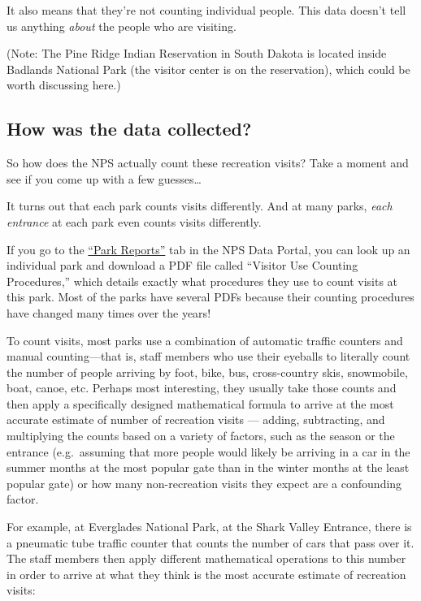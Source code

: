 \documentclass[
  letterpaper,
  DIV=11,
  numbers=noendperiod]{scrartcl}
\begin{document}
It also means that they're not counting individual people. This data
doesn't tell us anything \emph{about} the people who are visiting.

(Note: The Pine Ridge Indian Reservation in South Dakota is located
inside Badlands National Park (the visitor center is on the
reservation), which could be worth discussing here.)

\subsection{How was the data
collected?}\label{how-was-the-data-collected}

So how does the NPS actually count these recreation visits? Take a
moment and see if you come up with a few guesses\ldots{}

It turns out that each park counts visits differently. And at many
parks, \emph{each entrance} at each park even counts visits differently.

If you go to the \href{https://irma.nps.gov/Stats/Reports/Park}{``Park
Reports''} tab in the NPS Data Portal, you can look up an individual
park and download a PDF file called ``Visitor Use Counting Procedures,''
which details exactly what procedures they use to count visits at this
park. Most of the parks have several PDFs because their counting
procedures have changed many times over the years!

To count visits, most parks use a combination of automatic traffic
counters and manual counting---that is, staff members who use their
eyeballs to literally count the number of people arriving by foot, bike,
bus, cross-country skis, snowmobile, boat, canoe, etc. Perhaps most
interesting, they usually take those counts and then apply a
specifically designed mathematical formula to arrive at the most
accurate estimate of number of recreation visits --- adding,
subtracting, and multiplying the counts based on a variety of factors,
such as the season or the entrance (e.g.~assuming that more people would
likely be arriving in a car in the summer months at the most popular
gate than in the winter months at the least popular gate) or how many
non-recreation visits they expect are a confounding factor.

For example, at Everglades National Park, at the Shark Valley Entrance,
there is a pneumatic tube traffic counter that counts the number of cars
that pass over it. The staff members then apply different mathematical
operations to this number in order to arrive at what they think is the
most accurate estimate of recreation visits:
\end{document}
